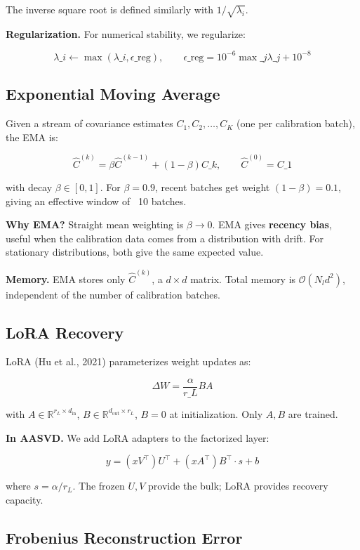 The inverse square root is defined similarly with $1/\sqrt{\lambda_i}$.

\textbf{Regularization.} For numerical stability, we regularize:

\[
\lambda\_i \leftarrow \max(\lambda\_i, \epsilon\_\text{reg}), \qquad
\epsilon\_\text{reg} = 10^{-6} \max\_j \lambda\_j + 10^{-8}
\tag{3.7}
\]

\subsection{Exponential Moving Average}

Given a stream of covariance estimates $C_1, C_2, \dots, C_K$ (one per 
calibration batch), the EMA is:

\[
\hat{C}^{(k)} = \beta \hat{C}^{(k-1)} + (1 - \beta) C\_k, \qquad
\hat{C}^{(0)} = C\_1
\tag{3.8}
\]

with decay $\beta \in [0, 1]$. For $\beta = 0.9$, recent batches get weight 
$(1 - \beta) = 0.1$, giving an effective window of ~10 batches.

\textbf{Why EMA?} Straight mean weighting is $\beta \to 0$. EMA gives 
\textbf{recency bias}, useful when the calibration data comes from a distribution 
with drift. For stationary distributions, both give the same expected value.

\textbf{Memory.} EMA stores only $\hat{C}^{(k)}$, a $d \times d$ matrix. Total 
memory is $\mathcal{O}(N_l d^2)$, independent of the number of calibration 
batches.

\subsection{LoRA Recovery}

LoRA (Hu et al., 2021) parameterizes weight updates as:

\[
\Delta W = \frac{\alpha}{r\_L} B A
\tag{3.9}
\]

with $A \in \mathbb{R}^{r_L \times d_\text{in}}$, $B \in \mathbb{R}^{d_\text{out} \times r_L}$, 
$B = 0$ at initialization. Only $A, B$ are trained.

\textbf{In AASVD.} We add LoRA adapters to the factorized layer:

\[
y = (x V^\top) U^\top + (x A^\top) B^\top \cdot s + b
\tag{3.10}
\]

where $s = \alpha / r_L$. The frozen $U, V$ provide the bulk; LoRA provides 
recovery capacity.

\subsection{Frobenius Reconstruction Error}

